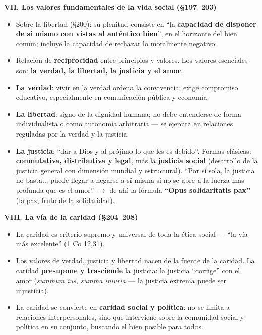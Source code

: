 \documentclass[10pt,a4paper]{article}
\begin{document}
\medskip\noindent \textbf{VII. Los valores fundamentales de la vida social (\S{}197--203)}\par\nopagebreak
\begin{itemize}
\item Sobre la libertad (\S{}200): su plenitud consiste en ``la \textbf{capacidad de disponer de sí mismo con vistas al auténtico bien}'', en el horizonte del bien común; incluye la capacidad de rechazar lo moralmente negativo.
\item Relación de \textbf{reciprocidad} entre principios y valores. Los valores esenciales son: \textbf{la verdad, la libertad, la justicia y el amor}.
\item \textbf{La verdad}: vivir en la verdad ordena la convivencia; exige compromiso educativo, especialmente en comunicación pública y economía.
\item \textbf{La libertad}: signo de la dignidad humana; no debe entenderse de forma individualista o como autonomía arbitraria --- se ejercita en relaciones reguladas por la verdad y la justicia.
\item \textbf{La justicia}: ``dar a Dios y al prójimo lo que les es debido''. Formas clásicas: \textbf{conmutativa, distributiva y legal}, más la \textbf{justicia social} (desarrollo de la justicia general con dimensión mundial y estructural). ``Por sí sola, la justicia no basta... puede llegar a negarse a sí misma si no se abre a la fuerza más profunda que es el amor'' $\rightarrow$ de ahí la fórmula \textbf{``Opus solidaritatis pax''} (la paz, fruto de la solidaridad).
\end{itemize}

\medskip\noindent \textbf{VIII. La vía de la caridad (\S{}204--208)}\par\nopagebreak
\begin{itemize}
\item La caridad es criterio supremo y universal de toda la ética social --- ``la vía más excelente'' (1 Co 12,31).
\item Los valores de verdad, justicia y libertad nacen de la fuente de la caridad. La caridad \textbf{presupone y trasciende} la justicia: la justicia ``corrige'' con el amor (\textit{summum ius, summa iniuria} --- la justicia extrema puede ser injusticia).
\item La caridad se convierte en \textbf{caridad social y política}: no se limita a relaciones interpersonales, sino que interviene sobre la comunidad social y política en su conjunto, buscando el bien posible para todos.
\end{itemize}
\end{document}
